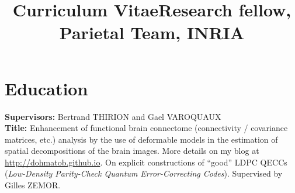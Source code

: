 \documentclass[11pt,a4paper,roman,unicode]{moderncv}
\title{Curriculum Vitae}
\title{Research fellow, Parietal Team, INRIA}
\begin{document}
\maketitle
\section{Education}
        {
          \textbf{Supervisors:} Bertrand THIRION and Gael VAROQUAUX\\
          \textbf{Title:} Enhancement of functional brain connectome (connectivity / covariance matrices, etc.) analysis
          by the use of deformable models in the estimation of spatial decompositions of the brain images.
         More details on my blog at \url{http://dohmatob.github.io}.}
{On explicit constructions of ``good'' LDPC QECCs (\emph{Low-Density Parity-Check Quantum Error-Correcting Codes}). Supervised by Gilles ZEMOR.}
{}
\end{document}
